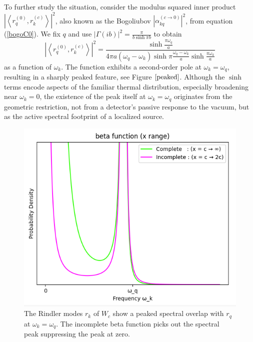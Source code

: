\documentclass[12pt,a4paper]{article}
\begin{document}
To further study the situation, consider the modulus squared inner product $\left|\left<r_q^{(0)}, r_k^{(c)} \right>\right|^2$, also known as the Bogoliubov $\left|\alpha^{(c \rightarrow 0)}_{kq}\right|^2$, from equation (\ref{bogoC0}).  We fix $q$ and use $|\Gamma(ib)|^2 = \frac{\pi}{b \sinh \pi b}$ to obtain
\begin{equation}
  \left|\left<r_q^{(0)}, r_k^{(c)} \right>\right|^2 = \frac{\sinh \frac{\pi \omega_q}{a}}{4\pi a (\omega_q - \omega_k) \sinh \pi \frac{\omega_q - \omega_k}{a} \sinh \frac{\pi \omega_k}{a}}
\end{equation}
as a function of $\omega_k$. The function exhibits a second-order pole at $\omega_k = \omega_q$, resulting in a sharply peaked feature, see Figure $\ref{peaked}$. Although the $\sinh$ terms encode aspects of the familiar thermal distribution, especially broadening near $\omega_k = 0$, the existence of the peak itself at $\omega_k = \omega_q$ originates from the geometric restriction, not from a detector’s passive response to the vacuum, but as the active spectral footprint of a localized source.

\begin{figure}[h]
  \centering
\includegraphics[scale=0.6]{peaked.png}
\caption{The Rindler modes $r_k$ of $W_c$ show a peaked spectral overlap with $r_q$ at $\omega_k = \omega_q$. The incomplete beta function picks out the spectral peak suppressing the peak at zero.}
\label{peaked}
\end{figure}
\end{document}
